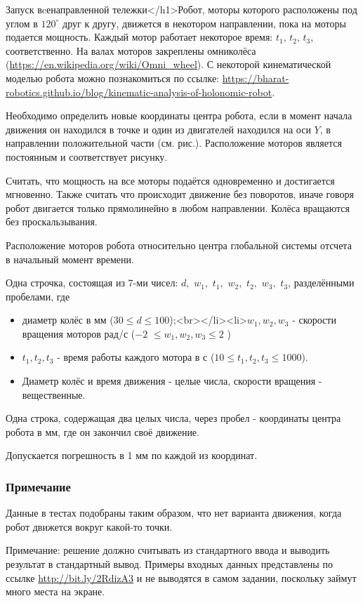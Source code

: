 
Запуск вcенаправленной тележки</h1>Робот, моторы которого расположены под углом в $120^{\circ}$ друг к другу, 
движется в некотором направлении, пока на моторы подается мощность. Каждый мотор работает некоторое время: 
$t_1$, $t_2$, $t_3$, соответственно. На валах моторов закреплены омниколёса 
(\url{https://en.wikipedia.org/wiki/Omni_wheel}). С некоторой кинематической моделью робота можно 
познакомиться по ссылке: 
\url{https://bharat-robotics.github.io/blog/kinematic-analysis-of-holonomic-robot}.

Необходимо определить новые координаты центра робота, если в момент начала движения он находился в точке 
и один из двигателей находился на оси $Y$, в направлении положительной части (см. рис.). 
Расположение моторов является постоянным и соответствует рисунку.

Считать, что мощность на все моторы подаётся одновременно и достигается мгновенно. Также считать что 
происходит движение без поворотов, иначе говоря робот двигается только прямолинейно в любом направлении. 
Колёса вращаются без проскальзывания.


Расположение моторов робота относительно центра глобальной системы отсчета в начальный момент времени.


Одна строчка, состоящая из 7-ми чисел: $d,$ $w_1,$ $t_1,$ $w_2,$ $t_2,$ $w_3,$ $t_3$, разделёнными пробелами, где

\begin{itemize}
    \item диаметр колёс в мм ($30 \leq d \leq 100$);<br></li><li>$w_1, w_2, w_3$ -  скорости вращения моторов рад/с ($-2$ $\leq w_1, w_2, w_3 \leq 2$ )
    \item $t_1, t_2, t_3$ - время работы каждого мотора в с ($10 \leq t_1, t_2, t_3 \leq 1000$).
    \item Диаметр колёс и время движения - целые числа, скорости вращения - вещественные.
\end{itemize}

\outputfmtSection

Одна строка, содержащая два целых числа, через пробел - координаты центра робота в мм, где он закончил своё движение.

Допускается погрешность в 1 мм по каждой из координат.

\subsubsection*{Примечание}

Данные в тестах подобраны таким образом, что нет варианта движения, когда робот движется вокруг какой-то точки.

Примечание: решение должно считывать из стандартного ввода и выводить результат в стандартный вывод. Примеры входных данных представлены по 
ссылке \url{http://bit.ly/2RdizA3} и не выводятся в самом задании, поскольку займут много места на экране.

